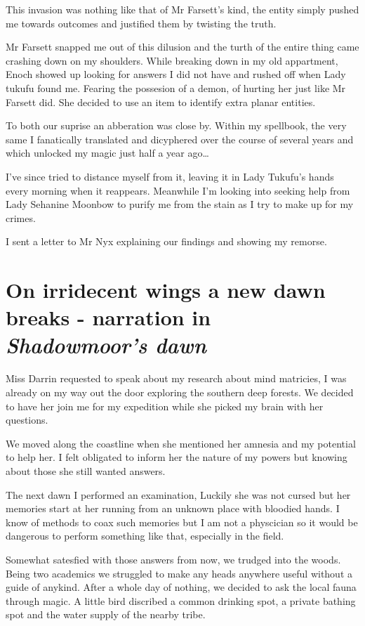 \documentclass{article}
\begin{document}
This invasion was nothing like that of Mr Farsett's kind, the entity simply pushed me towards outcomes and justified them by twisting the truth. 

Mr Farsett snapped me out of this dilusion and the turth of the entire thing came crashing down on my shoulders. While breaking down in my old appartment, Enoch showed up looking for answers I did not have and rushed off when Lady tukufu found me. Fearing the possesion of a demon, of hurting her just like Mr Farsett did. She decided to use an item to identify extra planar entities.

To both our suprise an abberation was close by. Within my spellbook, the very same I fanatically translated and dicyphered over the course of several years and which unlocked my magic just half a year ago\dots

I've since tried to distance myself from it, leaving it in Lady Tukufu's hands every morning when it reappears. Meanwhile I'm looking into seeking help from Lady Sehanine Moonbow to purify me from the stain as I try to make up for my crimes.

I sent a letter to Mr Nyx explaining our findings and showing my remorse. 


\section*{On irridecent wings a new dawn breaks - narration in \textit{Shadowmoor's dawn}}

Miss Darrin requested to speak about my research about mind matricies, I was already on my way out the door exploring the southern deep forests. We decided to have her join me for my expedition while she picked my brain with her questions.

We moved along the coastline when she mentioned her amnesia and my potential to help her. I felt obligated to inform her the nature of my powers but knowing about those she still wanted answers.

The next dawn I performed an examination, Luckily she was not cursed but her memories start at her running from an unknown place with bloodied hands. I know of methods to coax such memories but I am not a physcician so it would be dangerous to perform something like that, especially in the field.

Somewhat satesfied with those answers from now, we trudged into the woods. Being two academics we struggled to make any heads anywhere useful without a guide of anykind. After a whole day of nothing, we decided to ask the local fauna through magic. A little bird discribed a common drinking spot, a private bathing spot and the water supply of the nearby tribe.
\end{document}
